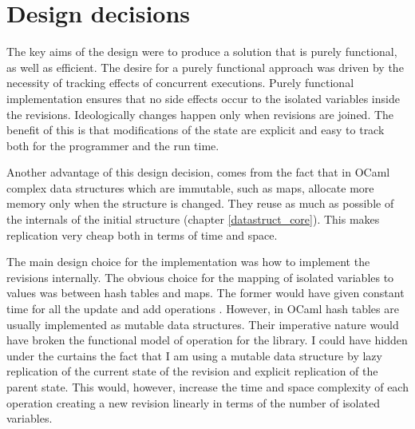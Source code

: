\documentclass[12pt,twoside,notitlepage]{report}
\begin{document}
{%

\section{Design decisions}
\label{design_decisions}
The key aims of the design were to produce a solution that is purely functional, as well as efficient. The desire for a purely functional approach was driven by the necessity of tracking effects of concurrent executions. Purely functional implementation ensures that no side effects occur to the isolated variables inside the revisions. Ideologically changes happen only when revisions are joined. The benefit of this is that modifications of the state are explicit and easy to track both for the programmer and the run time. 

Another advantage of this design decision, comes from the fact that in OCaml complex data structures which are immutable, such as maps, allocate more memory only when the structure is changed. They reuse as much as possible of the internals of the initial structure (chapter \ref{datastruct_core}). This makes replication very cheap both in terms of time and space.

The main design choice for the implementation was how to implement the revisions internally. The obvious choice for the mapping of isolated variables to values was between hash tables and maps. The former would have given constant time for all the update and add operations \cite{cormen}. However, in OCaml hash tables are usually implemented as mutable data structures. Their imperative nature would have broken the functional model of operation for the library. I could have hidden under the curtains the fact that I am using a mutable data structure by lazy replication of the current state of the revision and explicit replication of the parent state. This would, however, increase the time and space complexity of each operation creating a new revision linearly in terms of the number of isolated variables.

}
\end{document}
